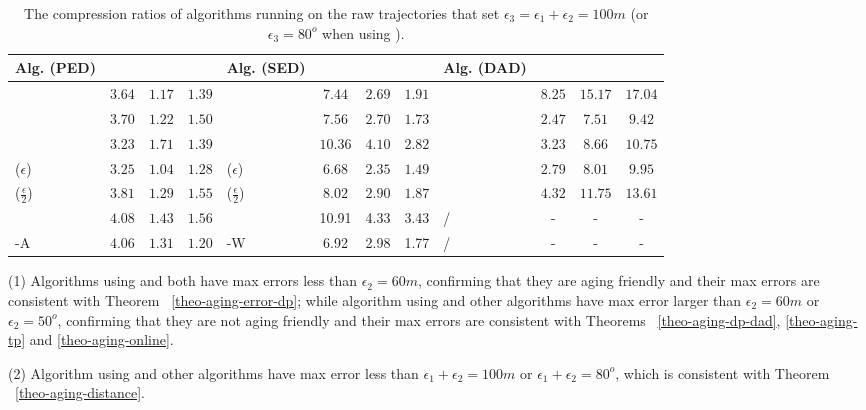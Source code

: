 {\begin{table}
	\caption{\small The compression ratios of algorithms running on the raw trajectories that set $\epsilon_3=\epsilon_1+\epsilon_2=100m$ (or $\epsilon_3=80^o$ when using \dad).}
	\centering
	\scriptsize
	\begin{tabular}{|l|c|c|c|l|c|c|c|l|c|c|c|}
		\hline
		\bf{Alg. (PED)}  &\ucar &\geolife &\mopsi & \bf{Alg. (SED)}  &\ucar &\geolife &\mopsi &\bf{Alg. (DAD)}  &\ucar &\geolife &\mopsi \\
		\hline
		{\dpa} &	$3.64$ & $ 1.17$ &	$1.39$	&\dpa &$7.44$ & $2.69$ &$1.91$  & \dpa	& $8.25$	& $15.17$	& $17.04$ \\
		\hline
		{\tpa} &	$3.70 $ & $1.22$ &	$1.50 $	&\tpa 	& $7.56 $& $2.70$ & $1.73 $ & \tpa	& $2.47 $	& $ 	7.51 $	& $ 	9.42  $ \\
		\hline
		{\bqsa} &	$3.23$ & $1.71$ &	$1.39 $	&\squishe &$10.36 $ & $4.10  $ & $2.82$ & \opwa	& $3.23$	& $8.66$	& $10.75$ \\
		\hline
		{\siped($\epsilon$)} &	$3.25$ & $ 1.04$ &	$1.28 $	&\cised($\epsilon$) & $6.68 $ &$ 2.35$ &$ 1.49	$ & \interval	& $2.79 $	& $8.01$	& $9.95 $ \\
		\hline
		{\siped($\frac{\epsilon}{2}$)} &	$3.81 $ & $1.29 $ &	$1.55 $ &\cised($\frac{\epsilon}{2}$) &$8.02  $ & $2.90$ & $1.87$& \intersec	& $4.32 $	& $11.75$	& $13.61 $ \\
		\hline
		{\operb} &	$4.08 $ & $1.43 $ & $1.56 $	& {\dagots} &10.91 &4.33 &3.43 & /&- &- &- \\
		\hline
		{\operb-A} &	${4.06} $ & ${1.31} $ & ${1.20} $	& {\cised-W} &6.92 &2.98 &1.77 & / &- &- &- \\
		\hline
	\end{tabular}
	\label{tab:cr}	
	\vspace{-2ex}
\end{table}

\ni (1) Algorithms \dpa using \ped and \sed both have max errors less than $\epsilon_2 = 60m$, confirming that they are aging friendly and their max errors are consistent with Theorem ~\ref{theo-aging-error-dp}; while algorithm \dpa using \dad and other algorithms have max error larger than $\epsilon_2 = 60m$ or $\epsilon_2 = 50^o$, confirming that they are not aging friendly and their max errors are consistent with Theorems ~\ref{theo-aging-dp-dad}, \ref{theo-aging-tp} and \ref{theo-aging-online}.

\ni (2) Algorithm \dpa using \dad and other algorithms have max error less than $\epsilon_1 + \epsilon_2 = 100m$ or $\epsilon_1 + \epsilon_2 = 80^o$, which is consistent with Theorem ~\ref{theo-aging-distance}.


}
